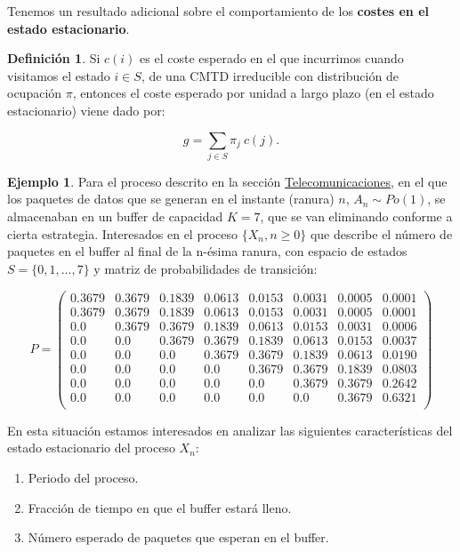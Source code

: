 \documentclass[
]{book}
\providecommand{\tightlist}{%
  \setlength{\itemsep}{0pt}\setlength{\parskip}{0pt}}
\newenvironment{yellowbox}{
  \definecolor{shadecolor}{rgb}{210, 180, 140}  
  \color{black}
  \begin{shaded}}
 {\end{shaded}}
\theoremstyle{definition}
\newtheorem{definition}{Definición}[chapter]
\theoremstyle{definition}
\newtheorem{example}{Ejemplo}[chapter]
\theoremstyle{definition}
\theoremstyle{definition}
\theoremstyle{remark}
\begin{document}
Tenemos un resultado adicional sobre el comportamiento de los \textbf{costes en el estado estacionario}.

\begin{yellowbox}

\begin{definition}
\protect\hypertarget{def:costesestacionarios}{}\label{def:costesestacionarios}Si \(c(i)\) es el coste esperado en el que incurrimos cuando visitamos el estado \(i \in S\), de una CMTD irreducible con distribución de ocupación \(\pi\), entonces el coste esperado por unidad a largo plazo (en el estado estacionario) viene dado por:

\[g= \sum_{j\in S} \pi_j \ c(j).\]
\end{definition}

\end{yellowbox}

\begin{example}

Para el proceso descrito en la sección \protect\hyperlink{telecomunicaciones}{Telecomunicaciones}, en el que los paquetes de datos que se generan en el instante (ranura) \(n\), \(A_n \sim Po(1)\), se almacenaban en un buffer de capacidad \(K=7\), que se van eliminando conforme a cierta estrategia. Interesados en el proceso \(\{X_n, n\geq 0\}\) que describe el número de paquetes en el buffer al final de la n-ésima ranura, con espacio de estados \(S=\{0, 1,..., 7\}\) y matriz de probabilidades de transición:

\[P = 
\begin{pmatrix}
0.3679 & 0.3679 & 0.1839 & 0.0613 & 0.0153 & 0.0031 & 0.0005 & 0.0001\\
0.3679 & 0.3679 & 0.1839 & 0.0613 & 0.0153 & 0.0031 & 0.0005 & 0.0001\\
0.0 & 0.3679 & 0.3679 & 0.1839 & 0.0613 & 0.0153 & 0.0031 & 0.0006\\
0.0 & 0.0 & 0.3679 & 0.3679 & 0.1839 & 0.0613 & 0.0153 & 0.0037\\
0.0 & 0.0 & 0.0& 0.3679 & 0.3679 & 0.1839 & 0.0613 & 0.0190\\
0.0 & 0.0 & 0.0& 0.0& 0.3679 & 0.3679 & 0.1839 & 0.0803\\
0.0 & 0.0 & 0.0& 0.0& 0.0& 0.3679 & 0.3679 & 0.2642\\
0.0 & 0.0 & 0.0& 0.0& 0.0& 0.0& 0.3679 & 0.6321\\
\end{pmatrix}\]

En esta situación estamos interesados en analizar las siguientes características del estado estacionario del proceso \(X_n\):

\begin{enumerate}
\def\labelenumi{\arabic{enumi}.}
\tightlist
\item
  Periodo del proceso.
\item
  Fracción de tiempo en que el buffer estará lleno.
\item
  Número esperado de paquetes que esperan en el buffer.
\end{enumerate}

\end{example}
\end{document}
